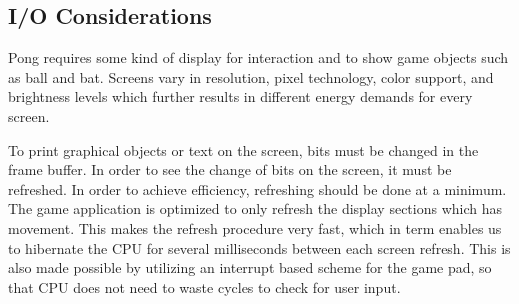 \subsection{I/O Considerations}

Pong requires some kind of display for interaction and to show game objects such as ball and bat. Screens vary in resolution, pixel technology, color support, and brightness levels which further results in different energy demands for every screen. 

To print graphical objects or text on the screen, bits must be changed in the frame buffer. In order to see the change of bits on the screen, it must be refreshed. In order to achieve efficiency, refreshing should be done at a minimum. The game application is optimized to only refresh the display sections which has movement. This makes the refresh procedure very fast, which in term enables us to hibernate the CPU for several milliseconds between each screen refresh. This is also made possible by utilizing an interrupt based scheme for the game pad, so that CPU does not need to waste cycles to check for user input.  